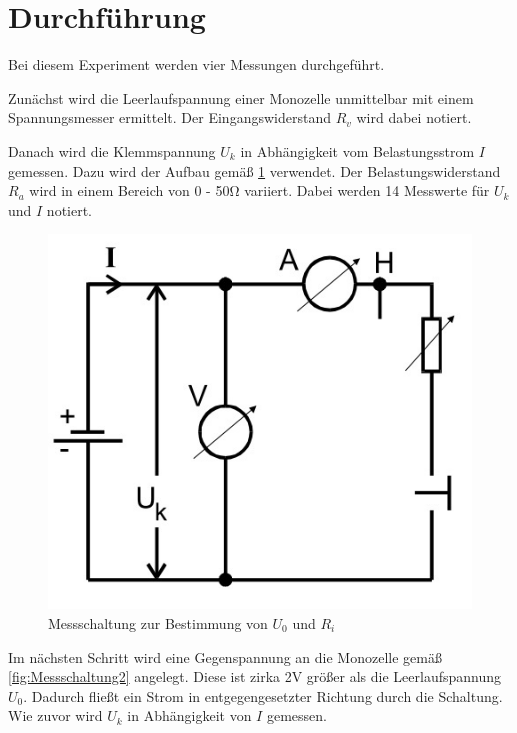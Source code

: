 \section{Durchführung}
Bei diesem Experiment werden vier Messungen durchgeführt. 

Zunächst wird die Leerlaufspannung einer Monozelle unmittelbar mit
einem Spannungsmesser ermittelt. Der Eingangswiderstand $R_v$ wird 
dabei notiert. 

Danach wird die Klemmspannung $U_k$ in Abhängigkeit vom Belastungsstrom
$I$ gemessen. Dazu wird der Aufbau gemäß \ref{fig:Messschaltung} verwendet. Der 
Belastungswiderstand $R_a$ wird in einem Bereich von 0 - 50\si{\ohm} 
variiert. Dabei werden 14 Messwerte für $U_k$ und $I$ notiert.

\begin{figure}[H]
\center
\includegraphics[scale=0.3]{Aufbau_b.jpg}
\caption{Messschaltung zur Bestimmung von $U_0$ und $R_i$}
\label{fig:Messschaltung}
\end{figure}

Im nächsten Schritt wird eine Gegenspannung an die Monozelle gemäß 
\ref{fig:Messschaltung2} angelegt. Diese ist zirka 2V größer als die Leerlaufspannung
$U_0$. Dadurch fließt ein Strom in entgegengesetzter Richtung durch die 
Schaltung. Wie zuvor wird $U_k$ in Abhängigkeit von $I$ gemessen. 


